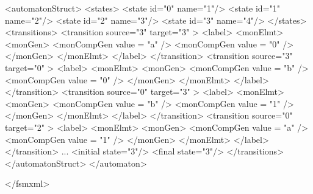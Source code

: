 {\footnotesize
\begin{listingcont}
  <automatonStruct>
    <states>
    <state  id="0"  name="1"/>
    <state  id="1"  name="2"/>
    <state  id="2"  name="3"/>
    <state  id="3"  name="4"/>
    </states>
    <transitions>
      <transition  source="3"  target="3" >
        <label>
	  <monElmt>
	    <monGen>
	      <monCompGen value = "a" />
	      <monCompGen value = "0" />
	    </monGen>
	  </monElmt>
        </label>
      </transition>
      <transition  source="3"  target="0" >
        <label>
	  <monElmt>
	    <monGen>
	      <monCompGen value = "b" />
	      <monCompGen value = "0" />
	    </monGen>
	  </monElmt>
        </label>
      </transition>
      <transition  source="0"  target="3" >
        <label>
	  <monElmt>
	    <monGen>
	      <monCompGen value = "b" />
	      <monCompGen value = "1" />
	    </monGen>
	  </monElmt>
        </label>
      </transition>
      <transition  source="0"  target="2" >
        <label>
	  <monElmt>
	    <monGen>
	      <monCompGen value = "a" />
	      <monCompGen value = "1" />
	    </monGen>
	  </monElmt>
        </label>
      </transition>
      ...
      <initial state="3"/>
      <final   state="3"/>
    </transitions>
  </automatonStruct>
</automaton>

</fsmxml>
\end{listingcont}
}

\clearpage
